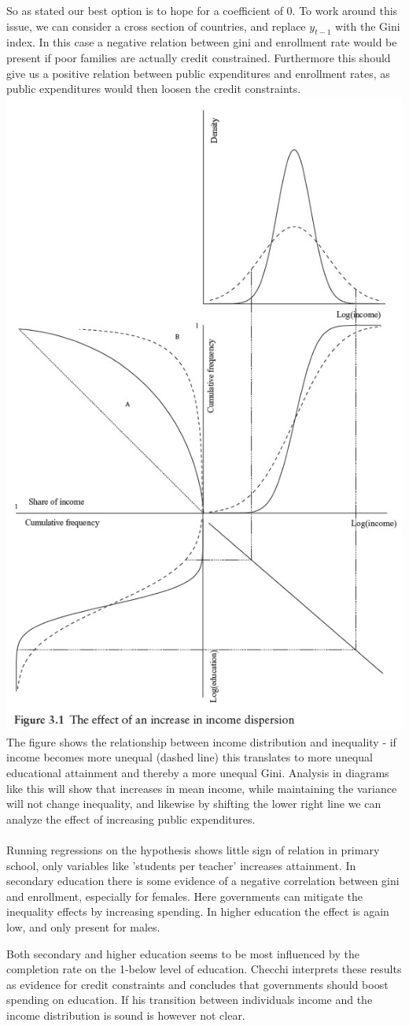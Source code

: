 \documentclass[12pt, a4paper]{article}
\begin{document}
\begin{multicols}{2}
\begin{itemize}
\end{itemize}
So as stated our best option is to hope for a coefficient of 0. To work around this issue, we can consider a cross section of countries, and replace $y_{t-1}$ with the Gini index. In this case a negative relation between gini and enrollment rate would be present if poor families are actually credit constrained. Furthermore this should give us a positive relation between public expenditures and enrollment rates, as public expenditures would then loosen the credit constraints.
\includegraphics[width = 0.45 \textwidth]{dist.jpg}
The figure shows the relationship between income distribution and inequality - if income becomes more unequal (dashed line) this translates to more unequal educational attainment and thereby a more unequal Gini. Analysis in diagrams like this will show that increases in mean income, while maintaining the variance will not change inequality, and likewise by shifting the lower right line we can analyze the effect of increasing public expenditures.
\\ \\
Running regressions on the hypothesis shows little sign of relation in primary school, only variables like 'students per teacher' increases attainment. In secondary education there is some evidence of a negative correlation between gini and enrollment, especially for females. Here governments can mitigate the inequality effects by increasing spending. In higher education the effect is again low, and only present for males. 

Both secondary and higher education seems to be most influenced by the completion rate on the 1-below level of education. Checchi interprets these results as evidence for credit constraints and concludes that governments should boost spending on education. If his transition between individuals income and the income distribution is sound is however not clear. 


\end{multicols}
\end{document}
